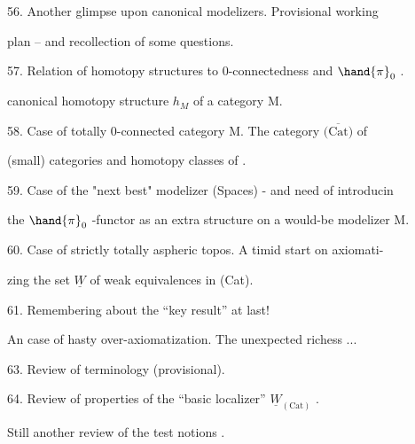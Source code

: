 56. Another glimpse upon canonical modelizers. Provisional working\par
plan -- and recollection of some questions.\par

57. Relation of homotopy structures to 0-connectedness and $\hand{\pi}_0$ . \par
canonical homotopy structure $h_M$ of a category M.\par

58. Case of totally 0-connected category M. The category $\overline{\text{(Cat)}}$ of\par
(small) categories and homotopy classes of .\par

59. Case of the "next best" modelizer (Spaces) - and need of introducin\par
the $\hand{\pi}_0$ -functor as an extra structure\unsure{*} on a would-be modelizer M.\par

60. Case of  strictly totally aspheric topos. A timid start on axiomati-\par%
zing the set $\underline{W}$ of weak equivalences in (Cat).\par

61. Remembering about the  ``key result'' at last!\par

\hand{\textcircled{\textcolor{black}{62.}}} An  case of hasty over-axiomatization. The unexpected richess ...\par

63. Review of terminology (provisional).\par

64. Review of properties of the ``basic localizer'' $\underline{W}_{(\text{Cat})}$ .\par
{}\par

\hand{\textcircled{\textcolor{black}{65.}}} Still another review of the test notions .\par

